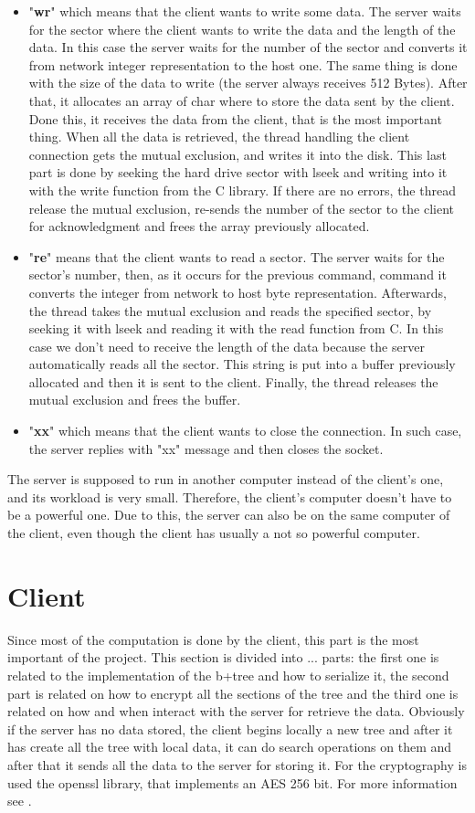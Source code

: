 \begin{itemize}
\item "\textbf{wr}" which means that the client wants to write some data. The server waits for the sector where the client wants to write the data and the length of the data. In this case the server waits for the number of the sector and converts it from network integer representation to the host one. 
The same thing is done with the size of the data to write (the server always receives 512 Bytes). After that, it allocates an array of char where to store the data sent by the client. Done this, it receives the data from the client, that is the most important thing. 
When all the data is retrieved, the thread handling the client connection gets the mutual exclusion, and writes it into the disk.
This last part is done by seeking the hard drive sector with lseek and writing into it with the write function from the C library.
If there are no errors, the thread release the mutual exclusion, re-sends the number of the sector to the client for acknowledgment and frees the array previously allocated.
\item "\textbf{re}" means that the client wants to read a sector. The server waits for the sector's number, then, as it occurs for the previous command, command it converts the integer from network to host byte representation. Afterwards, the thread takes the mutual exclusion and reads the specified sector, by seeking it with lseek and reading it with the read function from C. In this case we don't need to receive the length of the data because the server automatically reads all the sector.
This string is put into a buffer previously allocated and then it is sent  to the client. Finally, the thread releases the mutual exclusion and frees the buffer.
\item "\textbf{xx}" which means that the client wants to close the connection. In such case, the server replies with "xx" message and then closes the socket.

\end{itemize}
The server is supposed to run in another computer instead of the client's one, and its workload is very small. Therefore, the client's computer doesn't have to be a powerful one. Due to this, the server can also be on the same computer of the client, even though the client has usually a not so powerful computer.

\section{Client}
Since most of the computation is done by the client, this part is the most important of the project. This section is divided into ... parts: the first one is related to the implementation of the b+tree and how to serialize it, the second part is related on how to encrypt all the sections of the tree and the third one is related on how and when interact with the server for retrieve the data.
Obviously if the server has no data stored, the client begins locally a new tree and after it has create all the tree with local data, it can do search operations on them and after that it sends all the data to the server for storing it.
For the cryptography is used the openssl library, that implements an AES 256 bit. For more information see \cite{openssl}. 
